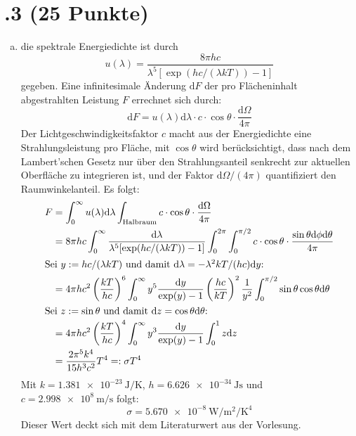 \section*{\nr.3 \titthree (25 Punkte)}
\begin{enumerate}[(a)]
\item die spektrale Energiedichte ist durch
\begin{equation}
u(\lambda) = \frac{8\pi h c}{\lambda^5[\exp(hc/(\lambda k T))-1]}
\end{equation}
gegeben. Eine infinitesimale Änderung $\mathrm{d}F$ der pro Flächeninhalt abgestrahlten Leistung $F$ errechnet sich durch:
\begin{equation}
\mathrm{d}F = u(\lambda) \mathrm{d}\lambda \cdot c \cdot \cos{\theta} \cdot \frac{\mathrm{d}\Omega}{4\pi}
\end{equation}
Der Lichtgeschwindigkeitsfaktor $c$ macht aus der Energiedichte eine Strahlungsleistung pro Fläche, mit $\cos{\theta}$ wird berücksichtigt, dass nach dem Lambert'schen Gesetz nur über den Strahlungsanteil senkrecht zur aktuellen Oberfläche zu integrieren ist, und der Faktor $\mathrm{d}\Omega/(4\pi)$ quantifiziert den Raumwinkelanteil. Es folgt:
\begin{align}
F &=\int_{0}^{\infty}u(\lambda) \mathrm{d}\lambda \int_\text{Halbraum}c \cdot \cos{\theta} \cdot \frac{\mathrm{d}\Omega}{4\pi} \\
&=8\pi h c\int_{0}^{\infty} \frac{\mathrm{d}\lambda }{\lambda^5[\exp(hc/(\lambda k T))-1]}\int_{0}^{2\pi}\int_{0}^{\pi/2}c \cdot \cos{\theta} \cdot \frac{\sin{\theta}\mathrm{d}\phi\mathrm{d}\theta}{4\pi} \\
\intertext{Sei $y:=hc/(\lambda k T)$ und damit $\mathrm{d}\lambda=-\lambda^2 k T/(hc)\mathrm{d}y$:}
&= 4\pi hc^2 \left(\frac{kT}{hc} \right)^6\int_{0}^{\infty}y^5\frac{\mathrm{d}y}{\exp(y)-1} \left(\frac{hc}{kT} \right)^2 \frac{1}{y^2} \int_{0}^{\pi/2}\sin{\theta}\cos{\theta} \mathrm{d}\theta\\
\intertext{Sei $z:=\sin{\theta}$ und damit $\mathrm{d}z=\cos{\theta}\mathrm{d}\theta$:}
&= 4 \pi h c^2\left(\frac{kT}{hc} \right)^4 \int_{0}^{\infty}y^3\frac{\mathrm{d}y}{\exp(y)-1} \int_0^{1} z \mathrm{d}z \\
&= \frac{2\pi^5  k^4}{15h^3c^2} T^4 =: \sigma T^4
\end{align}
Mit $k = \SI{1.381e-23}{\joule\per\kelvin}$, $h = \SI{6.626e-34}{\joule\second}$ und $c=\SI{2.998e8}{\meter\per\second}$ folgt:
\begin{equation}
\sigma = \SI{5.670e-8}{\watt\per\meter\squared\per\kelvin\tothe{4}}
\end{equation}
Dieser Wert deckt sich mit dem Literaturwert aus der Vorlesung.


\end{enumerate}
